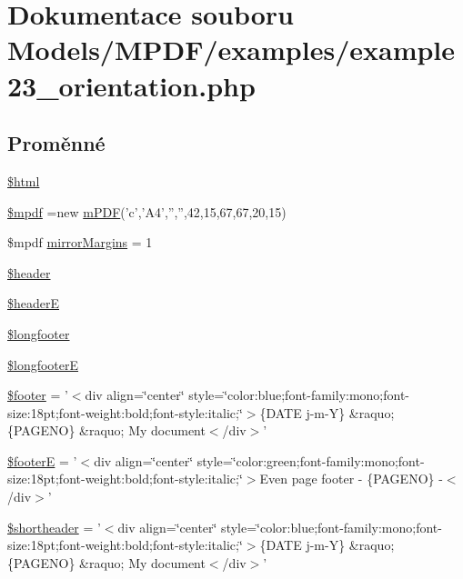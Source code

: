 \hypertarget{example23__orientation_8php}{\section{Dokumentace souboru Models/\-M\-P\-D\-F/examples/example23\-\_\-orientation.php}
\label{example23__orientation_8php}
}
\subsection*{Proměnné}
\begin{DoxyCompactItemize}
\item 
\hyperlink{example23__orientation_8php_a6f96e7fc92441776c9d1cd3386663b40}{\$html}
\item 
\hyperlink{example23__orientation_8php_ad028f81910d6cbab9b184d2214b3a8f8}{\$mpdf} =new \hyperlink{classm_p_d_f}{m\-P\-D\-F}('c','A4','','',42,15,67,67,20,15)
\item 
\$mpdf \hyperlink{example23__orientation_8php_a24c284cb7774410f65953584ea1fd9c1}{mirror\-Margins} = 1
\item 
\hyperlink{example23__orientation_8php_a4f44601f2b9dc8a1644bce53c94ce622}{\$header}
\item 
\hyperlink{example23__orientation_8php_a9fd8be48f713e8db03fa5cee78485f2e}{\$header\-E}
\item 
\hyperlink{example23__orientation_8php_ad95e81ee95bebca56ab645cd10f84716}{\$longfooter}
\item 
\hyperlink{example23__orientation_8php_aea21e8ae6aced69a5ec0d2bb00ca880b}{\$longfooter\-E}
\item 
\hyperlink{example23__orientation_8php_abaa4216c852c51c380dd8f10d3cfe944}{\$footer} = '$<$div align=\char`\"{}center\char`\"{} style=\char`\"{}color\-:blue;font-\/family\-:mono;font-\/size\-:18pt;font-\/weight\-:bold;font-\/style\-:italic;\char`\"{}$>$\{D\-A\-T\-E j-\/m-\/Y\} \&raquo; \{P\-A\-G\-E\-N\-O\} \&raquo; My document$<$/div$>$'
\item 
\hyperlink{example23__orientation_8php_a11a5e15badebbec27b59acdf150c2a63}{\$footer\-E} = '$<$div align=\char`\"{}center\char`\"{} style=\char`\"{}color\-:green;font-\/family\-:mono;font-\/size\-:18pt;font-\/weight\-:bold;font-\/style\-:italic;\char`\"{}$>$Even page footer -\/ \{P\-A\-G\-E\-N\-O\} -\/$<$/div$>$'
\item 
\hyperlink{example23__orientation_8php_a2fe60c986ad33d96728266b0f9d89eb2}{\$shortheader} = '$<$div align=\char`\"{}center\char`\"{} style=\char`\"{}color\-:blue;font-\/family\-:mono;font-\/size\-:18pt;font-\/weight\-:bold;font-\/style\-:italic;\char`\"{}$>$\{D\-A\-T\-E j-\/m-\/Y\} \&raquo; \{P\-A\-G\-E\-N\-O\} \&raquo; My document$<$/div$>$'

\end{DoxyCompactItemize}
